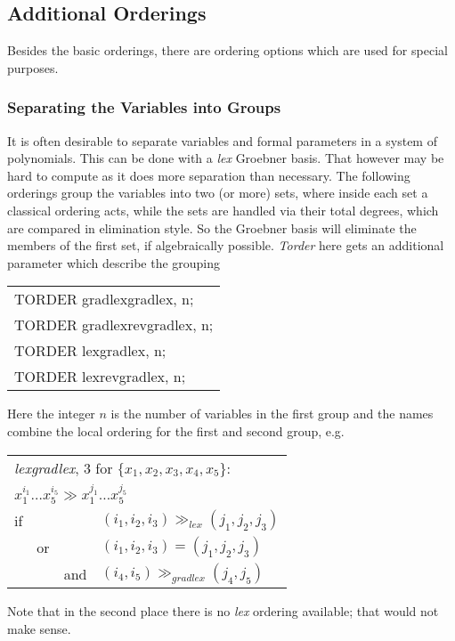 \subsection{Additional Orderings}
Besides the basic orderings, there are ordering options which are used for
special purposes.
\subsubsection{Separating the Variables into Groups }
It is often desirable to separate variables
and formal parameters in a system of polynomials.
This can be done with a {\it lex} Groebner
basis.  That however may be hard to compute as it does more
separation than necessary. The following orderings group the
variables into two (or more) sets, where inside each set a classical
ordering acts, while the sets are handled via their total degrees,
which are compared in elimination style. So the Groebner basis will
eliminate the members of the first set, if algebraically possible. {\it
Torder} here gets an additional parameter which describe the
grouping 
\begin{center}{\it
\begin{tabular}{l}
TORDER gradlexgradlex, n; \\
TORDER gradlexrevgradlex, n; \\
TORDER lexgradlex, n; \\
TORDER lexrevgradlex, n;
\end{tabular}}
\end{center}
Here the integer $n$ is the number of variables in the first group
and the names combine the local ordering for the first and second
group, e.g.
\begin{center}
\begin{tabular}{llll}
\multicolumn{4}{l}{{\it lexgradlex}, 3 for $\{x_1,x_2,x_3,x_4,x_5\}$:} \\
\multicolumn{4}{l}{$x_1^{i_1}\ldots x_5^{i_5} \gg x_1^{j_1}\ldots
x_5^{j_5}$} \\
if & & & $(i_1,i_2,i_3) \gg_{lex}(j_1,j_2,j_3)$ \\
& or & & $(i_1,i_2,i_3) = (j_1,j_2,j_3)$ \\
& & and & $(i_4,i_5) \gg_{gradlex}(j_4,j_5)$
\end{tabular}
\end{center}
Note that in the second place there is no {\it lex} ordering available;
that would not make sense.

